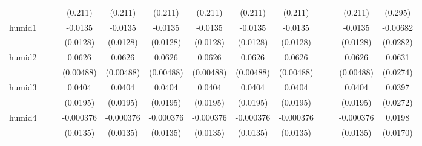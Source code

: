 {\begin{tabular}{l*{12}{c}}
            &                     &                     &     (0.211)         &     (0.211)         &     (0.211)         &     (0.211)         &     (0.211)         &     (0.211)         &                     &                     &     (0.211)         &     (0.295)         \\
[1em]
humid1      &                     &                     &     -0.0135         &     -0.0135         &     -0.0135         &     -0.0135         &     -0.0135         &     -0.0135         &                     &                     &     -0.0135         &    -0.00682         \\
            &                     &                     &    (0.0128)         &    (0.0128)         &    (0.0128)         &    (0.0128)         &    (0.0128)         &    (0.0128)         &                     &                     &    (0.0128)         &    (0.0282)         \\
[1em]
humid2      &                     &                     &      0.0626\sym{***}&      0.0626\sym{***}&      0.0626\sym{***}&      0.0626\sym{***}&      0.0626\sym{***}&      0.0626\sym{***}&                     &                     &      0.0626\sym{***}&      0.0631\sym{*}  \\
            &                     &                     &   (0.00488)         &   (0.00488)         &   (0.00488)         &   (0.00488)         &   (0.00488)         &   (0.00488)         &                     &                     &   (0.00488)         &    (0.0274)         \\
[1em]
humid3      &                     &                     &      0.0404         &      0.0404         &      0.0404         &      0.0404         &      0.0404         &      0.0404         &                     &                     &      0.0404         &      0.0397         \\
            &                     &                     &    (0.0195)         &    (0.0195)         &    (0.0195)         &    (0.0195)         &    (0.0195)         &    (0.0195)         &                     &                     &    (0.0195)         &    (0.0272)         \\
[1em]
humid4      &                     &                     &   -0.000376         &   -0.000376         &   -0.000376         &   -0.000376         &   -0.000376         &   -0.000376         &                     &                     &   -0.000376         &      0.0198         \\
            &                     &                     &    (0.0135)         &    (0.0135)         &    (0.0135)         &    (0.0135)         &    (0.0135)         &    (0.0135)         &                     &                     &    (0.0135)         &    (0.0170)         \\

\end{tabular}}
